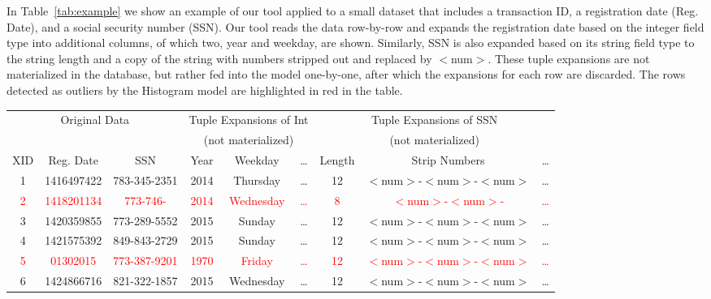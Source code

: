 In Table~\ref{tab:example} we show an example of our tool applied to a small dataset that includes a transaction ID, a registration date (Reg. Date), and a social security number (SSN).
Our tool reads the data row-by-row and expands the registration date based on the integer field type into additional columns, of which two, year and weekday, are shown.
Similarly, SSN is also expanded based on its string field type to the string length and a copy of the string with numbers stripped out and replaced by $<$num$>$.
These tuple expansions are not materialized in the database, but rather fed into the model one-by-one, after which the expansions for each row are discarded.
The rows detected as outliers by the Histogram model are highlighted in red in the table. 

\begin{table*}[t]
\begin{center}
\begin{tabular}{|c|c|c||c|c|c||c|c|c|}
\multicolumn{3}{c}{Original Data} & \multicolumn{3}{c}{Tuple Expansions of Int} & \multicolumn{3}{c}{Tuple Expansions of SSN} \\
\multicolumn{3}{c}{} & \multicolumn{3}{c}{(not materialized)} & \multicolumn{3}{c}{(not materialized)} \\
\hline
XID & Reg. Date & SSN & Year & Weekday & \ldots & Length & Strip Numbers & \ldots \\ \hline
\hline
1 & 1416497422 & 783-345-2351 & 2014 & Thursday &\ldots& 12 & $<$num$>$-$<$num$>$-$<$num$>$ &\ldots  \\ \hline
\textcolor{red}{2} &\textcolor{red}{ 1418201134 }&\textcolor{red}{ 773-746- }&\textcolor{red}{ 2014  }&\textcolor{red}{ Wednesday }&\textcolor{red}{\ldots}&\textcolor{red}{8}&\textcolor{red}{ $<$num$>$-$<$num$>$- }&\textcolor{red}{\ldots}  \\ \hline
3 & 1420359855 & 773-289-5552 & 2015  & Sunday &\ldots& 12 & $<$num$>$-$<$num$>$-$<$num$>$ &\ldots  \\ \hline
4 & 1421575392 & 849-843-2729 & 2015 & Sunday &\ldots& 12 & $<$num$>$-$<$num$>$-$<$num$>$ &  \ldots\\ \hline
\textcolor{red}{5 }&\textcolor{red}{ 01302015 }&\textcolor{red}{ 773-387-9201 }&\textcolor{red}{ 1970 }&\textcolor{red}{ Friday }&\textcolor{red}{\ldots}&\textcolor{red}{ 12 }&\textcolor{red}{ $<$num$>$-$<$num$>$-$<$num$>$ }&\textcolor{red}{  \ldots}\\ \hline
6 & 1424866716 & 821-322-1857 & 2015 & Wednesday &\ldots& 12 & $<$num$>$-$<$num$>$-$<$num$>$ &  \ldots\\ \hline

\end{tabular}
\end{center}
\end{table*}
